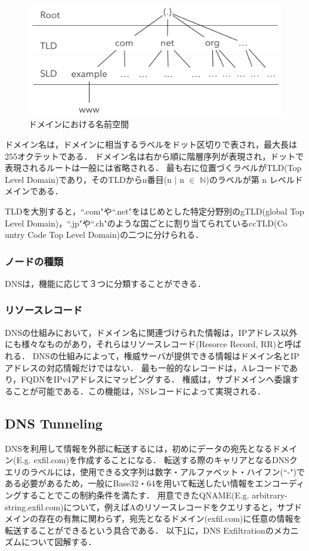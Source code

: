 \documentclass[12pt]{jarticle} %
\begin{document}
\begin{figure}[h]
 \centering
 \includegraphics[width=12.0cm]{images/dns-architecture.png}
 \caption{ドメインにおける名前空間}
 \label{dns-exfiltration}
\end{figure}

ドメイン名は，ドメインに相当するラベルをドット区切りで表され，最大長は255オクテットである．
ドメイン名は右から順に階層序列が表現され，ドットで表現されるルートは一般には省略される．
最も右に位置づくラベルがTLD(Top Level Domain)であり，そのTLDからn番目(n $\mid$ n $\in$ $\mathbb{N}$)のラベルが第 n レベルドメインである．

TLDを大別すると，``.com"や``.net"をはじめとした特定分野別のgTLD(global Top Level Domain)，``.jp"や``.ch"のような国ごとに割り当てられているccTLD(Co\\untry Code Top Level Domain)の二つに分けられる．

\subsubsection{ノードの種類}
DNSは，機能に応じて３つに分類することができる．

\subsubsection{リソースレコード}
DNSの仕組みにおいて，ドメイン名に関連づけられた情報は，IPアドレス以外にも様々なものがあり，それらはリソースレコード(Resorce Record, RR)と呼ばれる．
DNSの仕組みによって，権威サーバが提供できる情報はドメイン名とIPアドレスの対応情報だけではない．
最も一般的なレコードは，Aレコードであり，FQDNをIPv4アドレスにマッピングする．
権威は，サブドメインへ委譲することが可能である．この機能は，NSレコードによって実現される．

\subsection{DNS Tunneling}
DNSを利用して情報を外部に転送するには，初めにデータの宛先となるドメイン(E.g. exfil.com)を作成することになる．
転送する際のキャリアとなるDNSクエリのラベルには，使用できる文字列は数字・アルファベット・ハイフン(``-")である必要があるため，一般にBase32・64を用いて転送したい情報をエンコーディングすることでこの制約条件を満たす．
用意できたQNAME(E.g. arbitrary-string.exfil.com)について，例えばAのリソースレコードをクエリすると，サブドメインの存在の有無に関わらず，宛先となるドメイン(exfil.com)に任意の情報を転送することができるという具合である．
以下\ref{dns-exfiltration}に，DNS Exfiltrationのメカニズムについて図解する．
\end{document}
